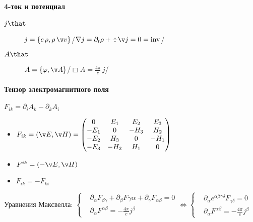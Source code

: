 \documentclass[draft]{trchesh}
\def\waveop{\mathop{\boldsymbol\Box}}
\begin{document}
\begin{multicols*}{3}
\paragraph{4-ток и потенциал}

\begin{description}
\item[$j \that$] $j=\{c\,\rho, \rho\,\v v\}$\hfill /$\nabla j=\partial_t\rho + \div\v j = 0 = \rm inv$/
\item[$A \that$] $A=\{\varphi, \v A\}$\hfill /$\waveop A = \frac{4\pi}{c} \, j$/
\end{description}

\paragraph{Тензор электромагнитного поля}
$F_{ik} = \partial_i A_k - \partial_k A_i$
\begin{itemize}
  \item $F_{ik} = (\v E, \v H) = \begin{pmatrix}
       0   &  E_1  &  E_2  &  E_3 \\
      -E_1 &  0    & -H_3  &  H_2 \\
      -E_2 &  H_3  &  0    & -H_1 \\
      -E_3 & -H_2  &  H_1  &  0   \\
  \end{pmatrix}$
\item $F^{ik} = (-\v E, \v H)$
\item $F_{ik} = -F_{ki}$
\end{itemize}

Уравнения Максвелла:
$\left\{
\begin{aligned}
  &\partial_\alpha F_{\beta\gamma}+\partial_\beta F{\gamma\alpha}+\partial_\gamma F_{\alpha\beta}=0\\
  &\partial_\alpha F^{\alpha \beta} = - \frac{4\pi}{c} j^\beta  
\end{aligned}\right. \Leftrightarrow
\left\{
\begin{aligned}
  &\partial_\alpha e^{\alpha\!\beta\gamma \delta} F_{\gamma \delta} = 0 \\
  &\partial_\alpha F^{\alpha \beta} = - \frac{4\pi}{c} j^\beta  
\end{aligned}\right.
$
\end{multicols*}
\end{document}
